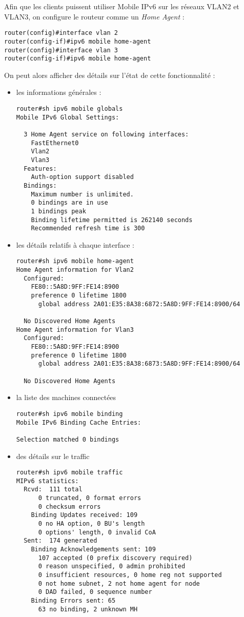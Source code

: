 Afin que les clients puissent utiliser Mobile IPv6 sur les réseaux VLAN2 et VLAN3, on configure le routeur comme un \emph{Home Agent} :

\begin{lstlisting}
router(config)#interface vlan 2
router(config-if)#ipv6 mobile home-agent
router(config)#interface vlan 3
router(config-if)#ipv6 mobile home-agent
\end{lstlisting}

On peut alors afficher des détails sur l'état de cette fonctionnalité :

\begin{itemize}

\item les informations générales :
\begin{lstlisting}
router#sh ipv6 mobile globals
Mobile IPv6 Global Settings:

  3 Home Agent service on following interfaces:
    FastEthernet0
    Vlan2
    Vlan3
  Features:
    Auth-option support disabled
  Bindings:
    Maximum number is unlimited.
    0 bindings are in use
    1 bindings peak
    Binding lifetime permitted is 262140 seconds
    Recommended refresh time is 300 
\end{lstlisting}

\item les détails relatifs à chaque interface :
\begin{lstlisting}
router#sh ipv6 mobile home-agent
Home Agent information for Vlan2
  Configured:
    FE80::5A8D:9FF:FE14:8900
    preference 0 lifetime 1800
      global address 2A01:E35:8A38:6872:5A8D:9FF:FE14:8900/64

  No Discovered Home Agents
Home Agent information for Vlan3
  Configured:
    FE80::5A8D:9FF:FE14:8900
    preference 0 lifetime 1800
      global address 2A01:E35:8A38:6873:5A8D:9FF:FE14:8900/64

  No Discovered Home Agents
\end{lstlisting}

\item la liste des machines connectées
\begin{lstlisting}
router#sh ipv6 mobile binding 
Mobile IPv6 Binding Cache Entries:

Selection matched 0 bindings
\end{lstlisting}

\item des détails sur le traffic
\begin{lstlisting}
router#sh ipv6 mobile traffic
MIPv6 statistics:
  Rcvd:  111 total
      0 truncated, 0 format errors
      0 checksum errors
    Binding Updates received: 109
      0 no HA option, 0 BU's length
      0 options' length, 0 invalid CoA
  Sent:  174 generated
    Binding Acknowledgements sent: 109
      107 accepted (0 prefix discovery required)
      0 reason unspecified, 0 admin prohibited
      0 insufficient resources, 0 home reg not supported
      0 not home subnet, 2 not home agent for node
      0 DAD failed, 0 sequence number
    Binding Errors sent: 65
      63 no binding, 2 unknown MH


\end{lstlisting}
\end{itemize}
